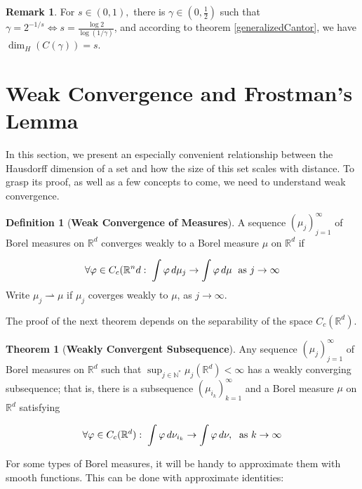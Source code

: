 \documentclass[12pt,a4paper]{report}
\theoremstyle{definition}
\newtheorem{theorem}{Theorem}
\newtheorem{definition}{Definition}
\newtheorem{remark}{Remark}
\begin{document}
\begin{remark}
For $s \in (0,1),$ there is $\gamma \in (0,\frac{1}{2})$ such that $\gamma = 2^{-1/s} \iff s = \frac{\log 2}{\log(1/\gamma)}$, and according to theorem \ref{generalizedCantor}, we have $\dim_{H}(C(\gamma)) = s$.
\end{remark}


\section{Weak Convergence and Frostman's Lemma}
In this section, we present an especially convenient relationship between the Hausdorff dimension of a set and how the size of this set scales with distance. To grasp its proof, as well as a few concepts to come, we need to understand weak convergence.

\begin{definition}[\textbf{Weak Convergence of Measures}]
A sequence $(\mu_j)_{j=1}^{\infty}$ of Borel measures on \( \mathbb{R}^d \) converges weakly to a Borel measure \( \mu \) on \( \mathbb{R}^d \) if

$$\forall \varphi \in C_c(\mathbb{R}^nd: \hspace{0.1 cm} \int \varphi \, d\mu_j \to \int \varphi \, d\mu \hspace{0.1 cm} \text{ as } j \to \infty$$
Write \( \mu_j \rightharpoonup \mu \) if $\mu_j$ coverges weakly to $\mu$, as \( j \to \infty \).
\end{definition}


The proof of the next theorem depends on the separability of the space \( C_c(\mathbb{R}^d) \).

\begin{theorem} [\textbf{Weakly Convergent Subsequence}] \label{wsubseq}
Any sequence $(\mu_j)_{j=1}^{\infty}$ of Borel measures on \( \mathbb{R}^d \) such that \( \sup_{j \in \mathbb{N}^*} \mu_j(\mathbb{R}^d) < \infty \) has a weakly converging subsequence; that is, there is a subsequence  $(\mu_{i_k}) _{k=1}^\infty$ and a Borel measure \( \mu \) on $\mathbb{R}^d$ satisfying

$$\forall \varphi \in C_c(\mathbb{R}^d): \hspace{0.1 cm}\int \varphi \, d\nu_{i_k} \to \int \varphi \, d\nu, \hspace{0.1 cm} \text{ as } k \to \infty$$
\end{theorem}

For some types of Borel measures, it will be handy to approximate them with smooth functions. This can be done with approximate identities:
\end{document}

